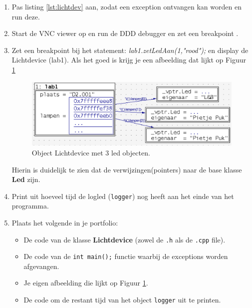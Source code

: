 \begin{enumerate}
	\item Pas listing  \ref{lst:lichtdev} aan, zodat een exception ontvangen kan worden en run deze.
	\item Start de VNC viewer op en run de DDD debugger en zet een breakpoint .
	\item Zet een breakpoint bij het statement: \textit{lab1.zetLedAan(1,"rood");} en display de Lichtdevice (lab1).
	 Als het goed is krijg je een afbeelding dat lijkt op Figuur \ref{fig:dddmld}
\begin{figure}[h!]
	\captionsetup{justification=centering}
	\includegraphics[width=0.95 \linewidth]{figuren/dddmeerdreld}     
	\centering
	\caption{Object Lichtdevice met 3 led objecten.}
	\label{fig:dddmld}
\end{figure}
Hierin is duidelijk te zien dat de verwijzingen(pointers) naar de base klasse \textbf{Led} zijn.
\item Print uit hoeveel tijd de logled (\texttt{logger}) nog heeft aan het einde van het programma.
\item Plaats het volgende in je portfolio:
\begin{itemize} 
\item De code van de klasse \textbf{Lichtdevice} (zowel de \texttt{.h} als de \texttt{.cpp} file).
\item De code van de  \texttt{int main();} functie waarbij de exceptions worden afgevangen.  
\item Je eigen afbeelding die lijkt op Figuur \ref{fig:dddmld}.
\item De code om de restant tijd van het object \texttt{logger} uit te printen. 
\end{itemize}	
	
\end{enumerate}